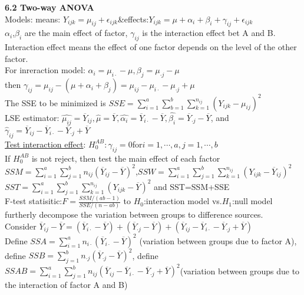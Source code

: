 \documentclass[10pt,a4paper,landscape]{article}
\begin{document}
\begin{multicols}{3}
{  
  
   \textbf{6.2 Two-way ANOVA}\\
   Models: means: $Y_{ijk}=\mu_{ij}+\epsilon_{ijk}$\&effects:$Y_{ijk}=\mu+\alpha_i+\beta_i+\gamma_{ij}+\epsilon_{ijk}$\\
   $\alpha_i$,$\beta_i$ are the main effect of factor, $\gamma_{ij}$ is the interaction effect bet A and B.\\
   Interaction effect means the effect of one factor depends on the level of the other factor.\\
   For inreraction model: $\alpha_i=\mu_{i\cdot}-\mu,\beta_j=\mu_{\cdot j}-\mu$\\
   then $\gamma_{ij}=\mu_{ij}-(\mu+\alpha_i+\beta_j)=\mu_{ij}-\mu_{i \cdot}-\mu_{\cdot j}+\mu $\\
   The SSE to be minimized is $SSE=\sum_{i=1}^a\sum_{b=1}^b\sum_{k=1}^{n_{ij}}(Y_{ijk}-\mu_{ij})^2 $\\
   LSE estimator: $\hat{\mu_{ij}}=\overline{Y}_{ij} , \hat{\mu}=\overline{Y}, \hat{\alpha_i}=\overline{Y}_{i\cdot}-\overline{Y}, \hat{\beta_i}=\overline{Y}_{\cdot j}-\overline{Y}$, and
   $\hat{\gamma}_{ij}=\overline{Y}_{ij}-\overline{Y}_{i\cdot}-\overline{Y}_{\cdot j}+\overline{Y}$\\  
   \underline{Test interaction effect}: $H_0^{AB}:\gamma_{ij}=0$for$i=1,\cdots,a,j=1,\cdots,b$\\
   If $H_0^{AB}$ is not reject, then test the main effect of each factor\\
   $SSM=\sum_{i=1}^a\sum_{j=1}^b n_{ij}(\overline{Y}_{ij}-\overline{Y})^2$,$SSW=\sum_{i=1}^a\sum_{j=1}^b \sum_{k=1}^{n_{ij}}(Y_{ijk}-\overline{Y}_{ij})^2$\\
   $SST=\sum_{i=1}^a\sum_{j=1}^b \sum_{k=1}^{n_{ij}}(Y_{ijk}-\overline{Y})^2$ and SST=SSM+SSE\\
   F-test statisitic:$F=\frac{SSM/(ab-1)}{SSE/(n-ab)} $ to $H_0$:interaction model vs.$H_1$:null model\\
   furtherly decompose the variation between groups  to difference sources.\\
   Consider $\overline{Y}_{ij}-\overline{Y}=(\overline{Y}_{i\cdot}-\overline{Y})+(\overline{Y}_{\cdot j}-\overline{Y})+(\overline{Y}_{ij}-\overline{Y}_{i\cdot}-\overline{Y}_{\cdot j}+\overline{Y})$\\
   Define $SSA=\sum_{i=1}^a n_{i\cdot}(\overline{Y}_{i\cdot}-\overline{Y})^2$ (variation between groups due to factor A), define $SSB=\sum_{j=1}^b n_{\cdot j}(\overline{Y}_{\cdot j}-\overline{Y})^2$, define $SSAB=\sum_{i=1}^a\sum_{j=1}^b n_{ij}(\overline{Y}_{ij}-\overline{Y}_{i\cdot}-\overline{Y}_{\cdot j}+\overline{Y} )^2$(variation between groups due to the interaction of factor A and B)\\
}
\end{multicols}
\end{document}
